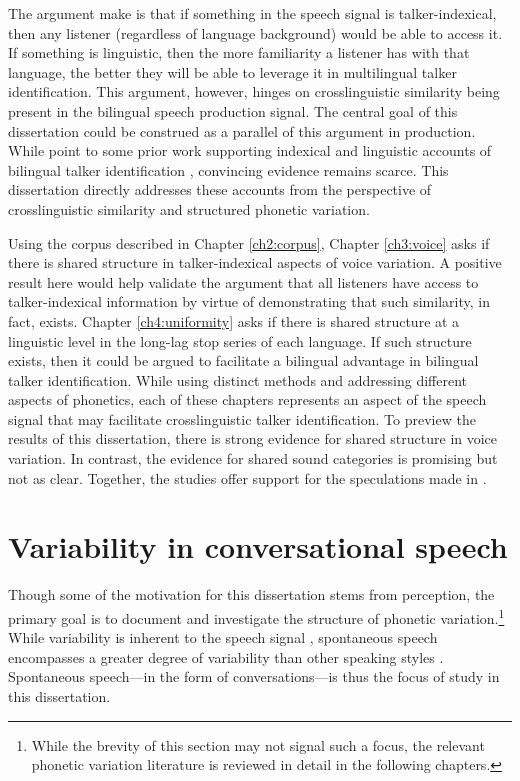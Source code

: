 The argument \citet{orena_2019_identifying} make is that if something in the speech signal is talker-indexical, then any listener (regardless of language background) would be able to access it. If something is linguistic, then the more familiarity a listener has with that language, the better they will be able to leverage it in multilingual talker identification. This argument, however, hinges on crosslinguistic similarity being present in the bilingual speech production signal. The central goal of this dissertation could be construed as a parallel of this argument in production. While \citet{orena_2019_identifying} point to some prior work supporting indexical and linguistic accounts of bilingual talker identification \citep[e.g.,]{theodore_2019_voice, sundara_2006_production}, convincing evidence remains scarce. This dissertation directly addresses these accounts from the perspective of crosslinguistic similarity and structured phonetic variation. 

Using the corpus described in Chapter \ref{ch2:corpus}, Chapter \ref{ch3:voice} asks if there is shared structure in talker-indexical aspects of voice variation. A positive result here would help validate the argument that all listeners have access to talker-indexical information by virtue of demonstrating that such similarity, in fact, exists. Chapter \ref{ch4:uniformity} asks if there is shared structure at a linguistic level in the long-lag stop series of each language. If such structure exists, then it could be argued to facilitate a bilingual advantage in bilingual talker identification. While using distinct methods and addressing different aspects of phonetics, each of these chapters represents an aspect of the speech signal that may facilitate crosslinguistic talker identification. To preview the results of this dissertation, there is strong evidence for shared structure in voice variation. In contrast, the evidence for shared sound categories is promising but not as clear. Together, the studies offer support for the speculations made in \citet{orena_2019_identifying}.

\section{Variability in conversational speech}\label{ch1:sec:spontaneous}

Though some of the motivation for this dissertation stems from perception, the primary goal is to document and investigate the structure of phonetic variation.\footnote{While the brevity of this section may not signal such a focus, the relevant phonetic variation literature is reviewed in detail in the following chapters.} While variability is inherent to the speech signal \citep[see the lack of invariance problem;][]{liberman_1967_perception}, spontaneous speech encompasses a greater degree of variability than other speaking styles \citep[e.g., reduction phenomena;][]{johnson_2004_massive}. Spontaneous speech---in the form of conversations---is thus the focus of study in this dissertation. 

